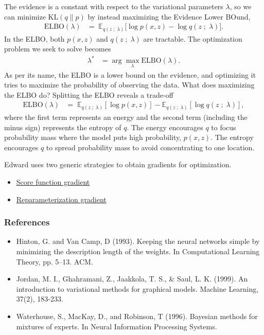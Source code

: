 The evidence is a constant with respect to the variational parameters $\lambda$,
so we can minimize $\text{KL}(q\|p)$ by instead maximizing
the Evidence Lower BOund,
\begin{align*}
  \text{ELBO}(\lambda)
  &=\;
  \mathbb{E}_{q(z\;;\;\lambda)}
  \big[
  \log p(x, z)
  -
  \log q(z\;;\;\lambda)
  \big].
\end{align*}
In the ELBO, both $p(x,z)$ and $q(z\;;\;\lambda)$ are
tractable. The optimization problem we seek to solve becomes
\begin{align*}
  \lambda^*
  &=
  \arg \max_\lambda \text{ELBO}(\lambda).
\end{align*}
As per its name, the ELBO is a lower bound on the evidence, and
optimizing it tries to maximize the probability of observing the data.
What does maximizing the ELBO do? Splitting the ELBO reveals a trade-off
\begin{align*}
  \text{ELBO}(\lambda)
  &=\;
  \mathbb{E}_{q(z \;;\; \lambda)}[\log p(x, z)]
  - \mathbb{E}_{q(z \;;\; \lambda)}[\log q(z\;;\;\lambda)],
\end{align*}
where the first term represents an energy and the second term
(including the minus sign) represents the entropy of $q$.
The energy encourages $q$ to focus probability mass where the
model puts high probability, $p(x, z)$.
The entropy encourages $q$ to spread probability mass to avoid
concentrating to one location.

Edward uses two generic strategies to obtain gradients for
optimization.
\begin{itemize}
    \item \href{tut_KLqp_score.html}{Score function gradient}
    \item \href{tut_KLqp_reparam.html}{Reparameterization gradient}
  \end{itemize}

\subsubsection{References}\label{references}

\begin{itemize}
\item
  Hinton, G. and Van Camp, D (1993). Keeping the neural networks
  simple by minimizing the description length of the weights. In
  Computational Learning Theory, pp. 5–13. ACM.
\item
  Jordan, M. I., Ghahramani, Z., Jaakkola, T. S., & Saul, L. K.
  (1999). An introduction to variational methods for graphical models.
  Machine Learning, 37(2), 183-233.
\item
  Waterhouse, S., MacKay, D., and Robinson, T (1996). Bayesian methods
  for mixtures of experts. In Neural Information Processing Systems.
\end{itemize}
